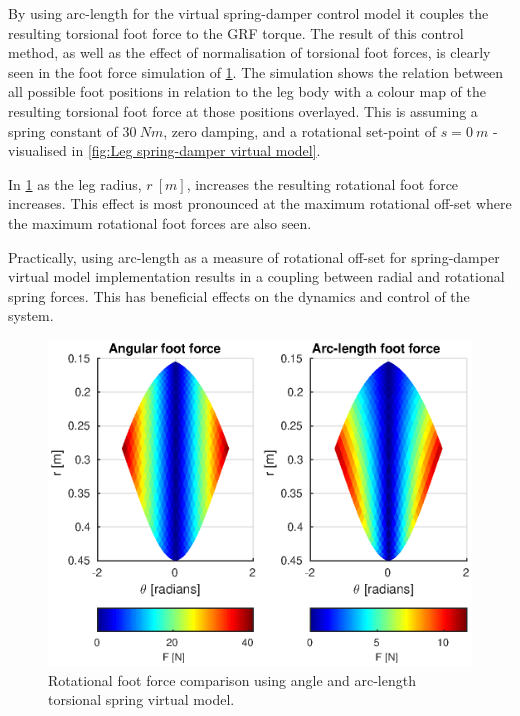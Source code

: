By using arc-length for the virtual spring-damper control model it couples the resulting torsional foot force to the GRF torque. The result of this control method, as well as the effect of normalisation of torsional foot forces, is clearly seen in the foot force simulation of \cref{fig:Rotational foot force comparison}. The simulation shows the relation between all possible foot positions in relation to the leg body with a colour map of the resulting torsional foot force at those positions overlayed. This is assuming a spring constant of $30\ Nm$, zero damping, and a rotational set-point of $s = 0\ m$ - visualised in \cref{fig:Leg spring-damper virtual model}.

In \cref{fig:Rotational foot force comparison} as the leg radius, $r\ [m]$, increases the resulting rotational foot force increases. This effect is most pronounced at the maximum rotational off-set where the maximum rotational foot forces are also seen. 

Practically, using arc-length as a measure of rotational off-set for spring-damper virtual model implementation results in a coupling between radial and rotational spring forces. This has beneficial effects on the dynamics and control of the system.

\begin{figure}
\centering
\includegraphics[width=1\textwidth]{images/control/theta-vs-arc.eps} 
\caption{Rotational foot force comparison using angle and arc-length torsional spring virtual model.}
\label{fig:Rotational foot force comparison}
\end{figure}

